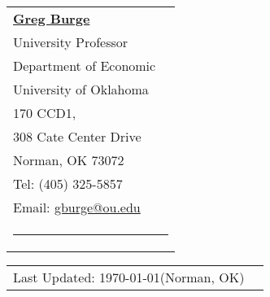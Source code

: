 \documentclass[10pt,letterpaper]{article}
\begin{document}
\begin{tabular}{p{4.25 in}p{3.75in}}
		\href{https://sites.create.ou.edu/gregburge1978/}{\textbf{Greg Burge}}                      & \\
	University Professor                                                                              &  \\
	Department of Economic                                                             & \\
	University of Oklahoma                                                                    & \\
	170 CCD1,                                                                                   & \\
	308 Cate Center Drive                                                                              &  \\
	Norman, OK 73072                                                                              &    \\
	Tel: (405) 325-5857                                                                         &  \\
	Email: \href{gburge@ou.edu}{gburge@ou.edu}                        &   \\
	
	\multicolumn{2}{p{7.5in}}{\hrule}
\end{tabular}

\vspace{1.5cm}
\begin{tabular}{p{3.5in}p{3.5in}}\\
	Last Updated: \today \hspace{0.1 cm}(Norman, OK) &\\
\end{tabular}
\end{document}
